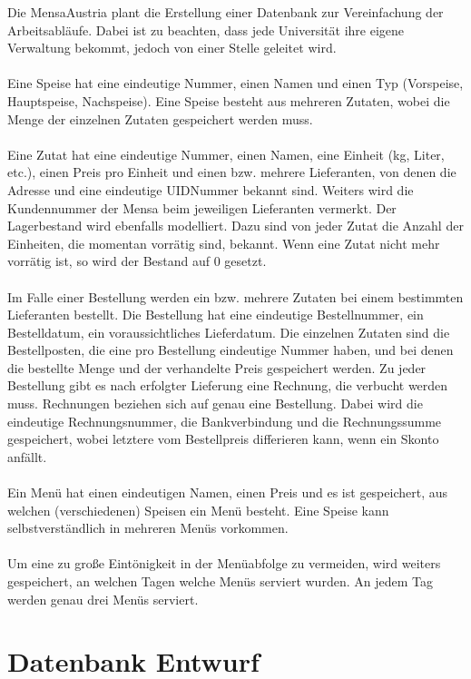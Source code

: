\documentclass[12pt,a4paper,draft]{report}
\begin{document}
	Die MensaAustria plant die Erstellung einer Datenbank zur Vereinfachung der Arbeitsabläufe. Dabei
	ist zu beachten, dass jede Universität ihre eigene Verwaltung bekommt, jedoch von einer Stelle
	geleitet wird.\\\\
	Eine Speise hat eine eindeutige Nummer, einen Namen und einen Typ (Vorspeise, Hauptspeise,
	Nachspeise). Eine Speise besteht aus mehreren Zutaten, wobei die Menge der einzelnen Zutaten
	gespeichert werden muss.\\\\
	Eine Zutat hat eine eindeutige Nummer, einen Namen, eine Einheit (kg, Liter, etc.), einen Preis pro
	Einheit und einen bzw. mehrere Lieferanten, von denen die Adresse und eine eindeutige
	UIDNummer bekannt sind. Weiters wird die Kundennummer der Mensa beim jeweiligen Lieferanten
	vermerkt. Der Lagerbestand wird ebenfalls modelliert. Dazu sind von jeder Zutat die Anzahl der
	Einheiten, die momentan vorrätig sind, bekannt. Wenn eine Zutat nicht mehr vorrätig ist, so wird der
	Bestand auf 0 gesetzt.\\\\
	Im Falle einer Bestellung werden ein bzw. mehrere Zutaten bei einem bestimmten Lieferanten
	bestellt. Die Bestellung hat eine eindeutige Bestellnummer, ein Bestelldatum, ein voraussichtliches
	Lieferdatum. Die einzelnen Zutaten sind die Bestellposten, die eine pro Bestellung eindeutige
	Nummer haben, und bei denen die bestellte Menge und der verhandelte Preis gespeichert werden.
	Zu jeder Bestellung gibt es nach erfolgter Lieferung eine Rechnung, die verbucht werden muss.
	Rechnungen beziehen sich auf genau eine Bestellung. Dabei wird die eindeutige Rechnungsnummer,
	die Bankverbindung und die Rechnungssumme gespeichert, wobei letztere vom Bestellpreis
	differieren kann, wenn ein Skonto anfällt.\\\\
	Ein Menü hat einen eindeutigen Namen, einen Preis und es ist gespeichert, aus welchen
	(verschiedenen) Speisen ein Menü besteht. Eine Speise kann selbstverständlich in mehreren Menüs
	vorkommen.\\\\
	Um eine zu große Eintönigkeit in der Menüabfolge zu vermeiden, wird weiters gespeichert, an
	welchen Tagen welche Menüs serviert wurden. An jedem Tag werden genau drei Menüs serviert.
	\chapter{Datenbank Entwurf}
\end{document}
